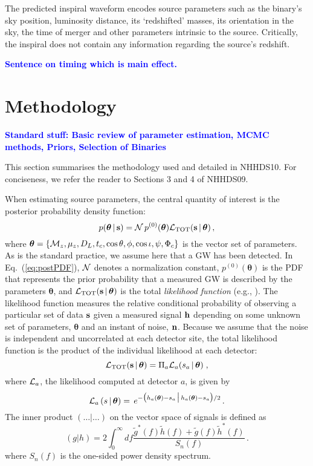 \documentclass{emulateapj}
\newcommand{\samaya}[1]{\textcolor{blue}{\bf #1}}
\begin{document}
The predicted inspiral waveform encodes source parameters such as the binary's
sky position,  luminosity distance, its `redshifted' masses, its
orientation in the sky, the time of merger and other parameters
intrinsic to the source. Critically, the inspiral does not contain any information regarding the source's redshift.  

\samaya{Sentence on timing which is main effect.}  
\section{Methodology}
\samaya{Standard stuff: Basic review of parameter estimation, MCMC methods, Priors, Selection of Binaries}

This section summarises the methodology used and detailed in NHHDS10. For conciseness, we refer the reader to Sections 3 and 4 of NHHDS09.  

When estimating source parameters, the central quantity of interest is the posterior probability
density function:
\begin{equation}
\label{eq:postPDF}
p({\boldsymbol \theta} \, | \, {\bf s}) = {\cal N} \, p^{(0)}
({\boldsymbol{\theta}}) {\cal L}_{\rm TOT} ({\bf s} \, |
\,{\boldsymbol{\theta}}) \,, 
\end{equation}
where ${\boldsymbol{\theta}} = \{ {\cal M}_z, \mu_z, D_L, t_c, \cos \theta, \phi, \cos \iota, \psi,
\Phi_c \}$ is the vector set of parameters. As is the standard practice,
we assume here that a GW has been detected. In Eq.\
(\ref{eq:postPDF}), ${\cal N}$ denotes a normalization constant,
$p^{(0)}({\boldsymbol{\theta}})$ is the PDF that represents the prior
probability that a measured GW is described by the parameters
$\boldsymbol{\theta}$, and ${\cal L}_{\rm TOT} (\bf{s} \, | \,
{\boldsymbol \theta} )$ is the total {\it likelihood function} (e.g.,
\citealt{mackay03}).  The likelihood function measures the relative
conditional probability of observing a particular set of data $\bf{s}$
given a measured signal ${\bf h}$ depending on some unknown set
of parameters, $\boldsymbol{\theta}$ and an instant of noise, ${\bf n}$.  Because we
assume that the noise is independent and uncorrelated at each detector
site, the total likelihood function is the product of
the individual likelihood at each detector:
\begin{equation}
\label{eq:totLike}
{\cal L}_{\rm TOT} ({\bf s} \, | \,{\boldsymbol \theta}) = \Pi_{a}
{\cal L}_a (s_a \, | \,{\boldsymbol \theta})\;,
\end{equation}
where ${\cal L}_a$, the likelihood computed at detector $a$, is given
by \citep{finn92}
\begin{equation}
\label{eq:Like}
{\cal L}_a \, (s \, | \,{\boldsymbol \theta}) = \, e^{ -
\big( h_a({\boldsymbol \theta}) - s_a \, \big| \, h_a({\boldsymbol
\theta}) - s_a \big)/2 } \, .
\end{equation}
The inner product $\left( \ldots | \ldots \right)$ on the vector space
of signals is defined as
\begin{equation}
(g|h) = 2 \int_0^{\infty} df \frac{\tilde{g}^*(f)\tilde{h}(f) +
\tilde{g}(f)\tilde{h}^*(f)}{S_n(f)} \, .
\label{eq:innerproduct}
\end{equation}
where $S_n(f)$ is the one-sided power density spectrum.
\end{document}
